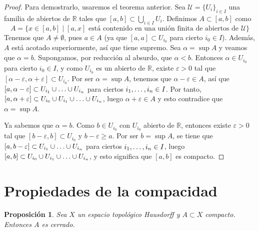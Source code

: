 \documentclass[12pt]{report}
\newtheorem{proposition}{Proposición}[chapter]
\theoremstyle{definition}
\theoremstyle{definition}
\theoremstyle{remark}
\newcommand{\R}{\mathbb R}
\begin{document}
\begin{proof}
Para demostrarlo, usaremos el teorema anterior. Sea $\mathcal{U} = \{U_i\}_{i \in I}$ una familia de abiertos de $\R$ tales que $[a,b] \subset \bigcup_{i \in I}U_i$. Definimos $A \subset [a,b]$ como
\[A = \{x \in [a,b] \mid [a,x] \textrm{ está contenido en una unión finita de abiertos de } \mathcal{U}\}\]
Tenemos que $A \neq \emptyset$, pues $a \in A$ (ya que $[a,a] \subset U_{i_0}$ para cierto $i_0 \in I$). Además, $A$ está acotado superiormente, así que tiene supremo. Sea $\alpha = \sup{A}$ y veamos que $\alpha = b$. Supongamos, por reducción al absurdo, que $\alpha < b$. Entonces $\alpha \in U_{i_0}$ para cierto $i_0 \in I$, y como $U_{i_0}$ es un abierto de $\R$, existe $\varepsilon > 0$ tal que $[\alpha - \varepsilon, \alpha + \varepsilon] \subset U_{i_0}$. Por ser $\alpha = \sup{A}$, tenemos que $\alpha - \varepsilon \in A$, así que $[a, \alpha - \varepsilon] \subset U_{i_1} \cup \mathellipsis \cup U_{i_n}$ para ciertos $i_1,\mathellipsis,i_n \in I$. Por tanto, $[a, \alpha + \varepsilon] \subset U_{i_0} \cup U_{i_1} \cup \mathellipsis \cup U_{i_n}$, luego $\alpha + \varepsilon \in A$ y esto contradice que $\alpha = \sup{A}$.

\vspace{2mm}
Ya sabemos que $\alpha = b$. Como $b \in U_{i_0}$ con $U_{i_0}$ abierto de $\R$, entonces existe $\varepsilon > 0$ tal que $[b - \varepsilon, b] \subset U_{i_0}$ y $b - \varepsilon \geq a$. Por ser $b = \sup{A}$, se tiene que $[a,b-\varepsilon] \subset U_{i_1} \cup \mathellipsis \cup U_{i_n}$ para ciertos $i_1,\mathellipsis,i_n \in I$, luego $[a,b] \subset U_{i_0} \cup U_{i_1} \cup \mathellipsis \cup U_{i_n}$, y esto significa que $[a,b]$ es compacto. 
\end{proof}

\section{Propiedades de la compacidad}

\begin{proposition}
Sea $X$ un espacio topológico Hausdorff y $A \subset X$ compacto. Entonces $A$ es cerrado.    
\end{proposition}
\end{document}
